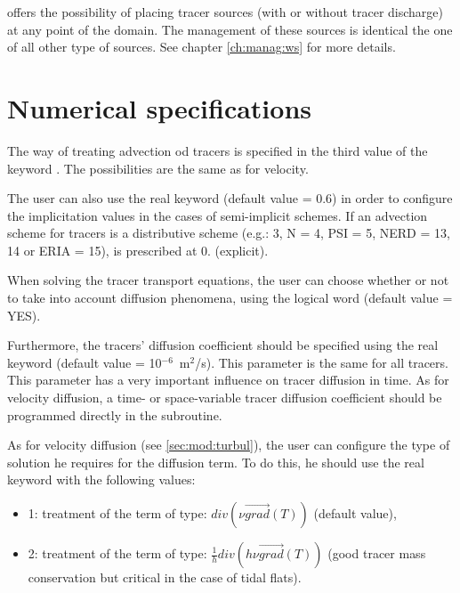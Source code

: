  offers the possibility of placing tracer sources
(with or without tracer discharge) at any point of the domain.
The management of these sources is identical the one of all other type of
sources.
See chapter \ref{ch:manag:ws} for more details.


\section{Numerical specifications}
\label{sec:num:spec}
The way of treating advection od tracers is specified in the third value
of the keyword .
The possibilities are the same as for velocity.

The user can also use the real keyword
 (default value = 0.6) in order to
configure the implicitation values in the cases of semi-implicit schemes.
If an advection scheme for tracers is a distributive scheme
(e.g.: 3, N = 4, PSI = 5, NERD = 13, 14 or ERIA = 15),
 is prescribed at 0. (explicit).

When solving the tracer transport equations, the user can choose
whether or not to take into account diffusion phenomena,
using the logical word 
(default value = YES).

Furthermore, the tracers' diffusion coefficient should be specified using
the real keyword 
(default value = 10$^{-6}$~m$^2$/s).
This parameter is the same for all tracers.
This parameter has a very important influence on tracer diffusion in time.
As for velocity diffusion, a time- or space-variable tracer diffusion
coefficient should be programmed directly in the  subroutine.

As for velocity diffusion (see \ref{sec:mod:turbul}), the user can configure
the type of solution he requires for the diffusion term.
To do this, he should use the real keyword
 with the following values:

\begin{itemize}
\item 1: treatment of the term of type:
$div\left(\nu \overrightarrow{grad}\left(T\right)\right)$
(default value),

\item 2: treatment of the term of type:
$\frac{1}{h}div\left(h \nu \overrightarrow{grad}\left(T\right)\right)$
(good tracer mass conservation but critical in the case of tidal flats).
\end{itemize}


